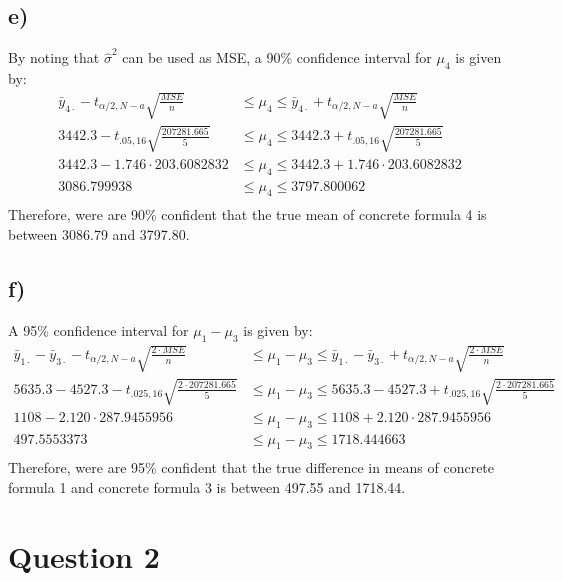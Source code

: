 \documentclass{article}
\begin{document}
\subsection*{e)}
  By noting that $\hat{\sigma}^2$ can be used as MSE,
  a 90\% confidence interval for $\mu_4$ is given by:
  \begin{align*}
    \bar{y}_{4 \cdot} - t_{\alpha / 2, N-a} \sqrt{\frac{MSE}{n}} &\leq
    \mu_4 \leq \bar{y}_{4 \cdot} + t_{\alpha / 2, N-a} \sqrt{\frac{MSE}{n}} \\
    3442.3 - t_{.05, 16} \sqrt{\frac{207281.665}{5}} &\leq
    \mu_4 \leq 3442.3 + t_{.05 , 16} \sqrt{\frac{207281.665}{5}} \\
    3442.3 - 1.746 \cdot 203.6082832 &\leq
    \mu_4 \leq 3442.3 + 1.746 \cdot 203.6082832 \\
    3086.799938 &\leq
    \mu_4 \leq 3797.800062 \\
  \end{align*}
  Therefore, were are 90\% confident that the true mean of concrete formula 4 is between 3086.79 and 3797.80.
\subsection*{f)}
A 95\% confidence interval for $\mu_1 - \mu_3$ is given by:
\begin{align*}
  \bar{y}_{1 \cdot} - \bar{y}_{3 \cdot} - t_{\alpha / 2, N-a} \sqrt{\frac{2 \cdot MSE}{n}} &\leq
  \mu_1 - \mu_3 \leq \bar{y}_{1 \cdot} - \bar{y}_{3 \cdot} + t_{\alpha / 2, N-a} \sqrt{\frac{2 \cdot MSE}{n}} \\
  5635.3 - 4527.3 - t_{.025, 16} \sqrt{\frac{2 \cdot 207281.665}{5}} &\leq
  \mu_1 - \mu_3 \leq 5635.3 - 4527.3 + t_{.025, 16} \sqrt{\frac{2 \cdot 207281.665}{5}} \\
  1108 - 2.120 \cdot 287.9455956 &\leq
  \mu_1 - \mu_3 \leq 1108 + 2.120 \cdot 287.9455956 \\
  497.5553373 &\leq
  \mu_1 - \mu_3 \leq 1718.444663 \\
\end{align*}
Therefore, were are 95\% confident that the true difference in means of concrete formula 1 and concrete formula 3 is between 497.55 and 1718.44.
\clearpage
\section*{Question 2}
\end{document}
